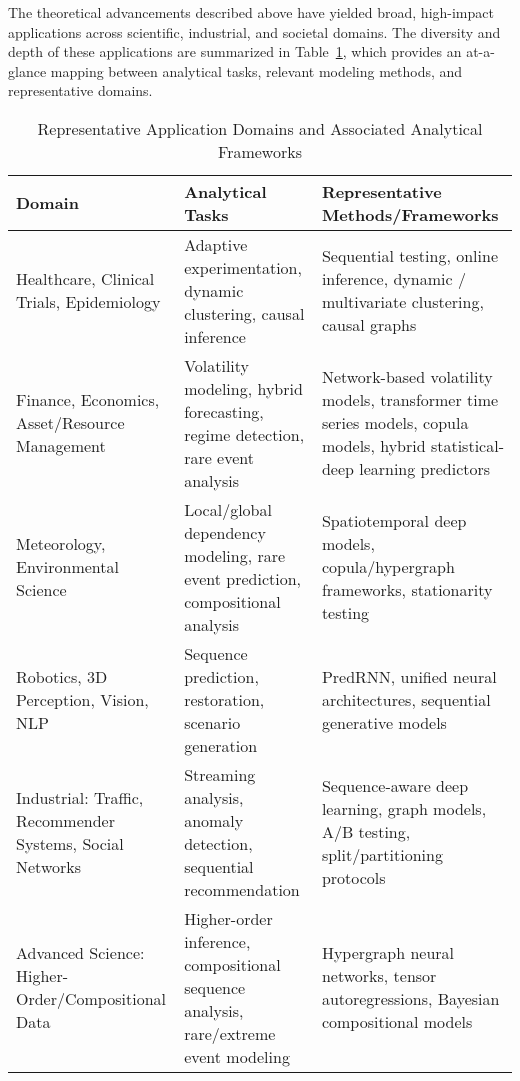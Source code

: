 \documentclass[11pt]{article}
\begin{document}
The theoretical advancements described above have yielded broad, high-impact applications across scientific, industrial, and societal domains. The diversity and depth of these applications are summarized in Table~\ref{tab:application_domains}, which provides an at-a-glance mapping between analytical tasks, relevant modeling methods, and representative domains.

\begin{table}[h!]
    \centering
    \caption{Representative Application Domains and Associated Analytical Frameworks}
    \label{tab:application_domains}
    \begin{tabular}{|p{3cm}|p{3.8cm}|p{6.5cm}|}
    \hline
    \textbf{Domain} & \textbf{Analytical Tasks} & \textbf{Representative Methods/Frameworks} \\
    \hline
    Healthcare, Clinical Trials, Epidemiology 
        & Adaptive experimentation, dynamic clustering, causal inference 
        & Sequential testing, online inference, dynamic / multivariate clustering, causal graphs \cite{ref24,ref25,ref30,ref81,ref86} \\
    \hline
    Finance, Economics, Asset/Resource Management 
        & Volatility modeling, hybrid forecasting, regime detection, rare event analysis 
        & Network-based volatility models, transformer time series models, copula models, hybrid statistical-deep learning predictors \cite{ref2,ref7,ref8,ref10,ref16,ref59,ref60} \\
    \hline
    Meteorology, Environmental Science 
        & Local/global dependency modeling, rare event prediction, compositional analysis 
        & Spatiotemporal deep models, copula/hypergraph frameworks, stationarity testing \cite{ref32,ref35,ref58,ref59,ref79} \\
    \hline
    Robotics, 3D Perception, Vision, NLP 
        & Sequence prediction, restoration, scenario generation 
        & PredRNN, unified neural architectures, sequential generative models \cite{ref37,ref39,ref40,ref73,ref74} \\
    \hline
    Industrial: Traffic, Recommender Systems, Social Networks 
        & Streaming analysis, anomaly detection, sequential recommendation 
        & Sequence-aware deep learning, graph models, A/B testing, split/partitioning protocols \cite{ref2,ref9,ref47,ref58,ref85,ref87} \\
    \hline
    Advanced Science: Higher-Order/Compositional Data 
        & Higher-order inference, compositional sequence analysis, rare/extreme event modeling 
        & Hypergraph neural networks, tensor autoregressions, Bayesian compositional models \cite{ref58,ref59,ref60,ref61,ref65,ref74} \\
    \hline
    \end{tabular}
\end{table}
\end{document}
